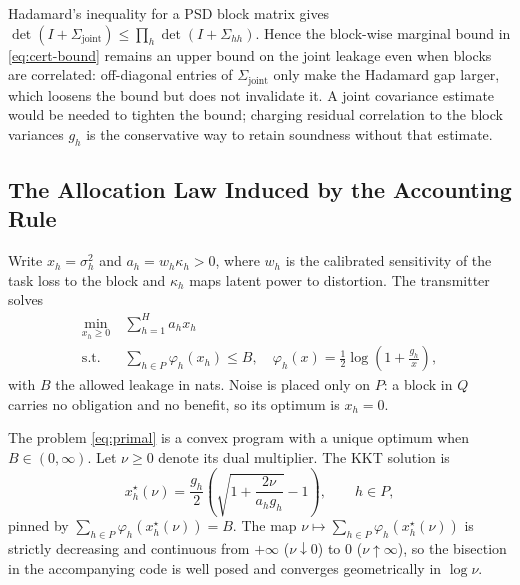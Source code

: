 \begin{remark}
\label{rm:corr}
Hadamard's inequality for a PSD block matrix gives
$\det(I+\Sigma_{\mathrm{joint}})\le\prod_h\det(I+\Sigma_{hh})$. Hence the
block-wise marginal bound in \eqref{eq:cert-bound} remains an upper bound on
the joint leakage even when blocks are correlated: off-diagonal entries of
$\Sigma_{\mathrm{joint}}$ only make the Hadamard gap larger, which loosens
the bound but does not invalidate it. A joint covariance estimate would be
needed to tighten the bound; charging residual correlation to the block
variances $g_h$ is the conservative way to retain soundness without that
estimate.
\end{remark}

\subsection{The Allocation Law Induced by the Accounting Rule}
\label{sec:allocation}

Write $x_h=\sigma_h^{2}$ and $a_h=w_h\kappa_h>0$, where $w_h$ is the
calibrated sensitivity of the task loss to the block and $\kappa_h$ maps
latent power to distortion. The transmitter solves
\begin{equation}\begin{split}
\min_{x_h\ge0}\ &\sum_{h=1}^{H} a_h x_h\\
\text{s.t.}\ &\sum_{h\in P}\varphi_h(x_h)\le B,\quad
\varphi_h(x)=\tfrac12\log\!\left(1+\frac{g_h}{x}\right),
\end{split}\label{eq:primal}
\end{equation}
with $B$ the allowed leakage in nats. Noise is placed only on $P$: a block in
$Q$ carries no obligation and no benefit, so its optimum is $x_h=0$.

\begin{theorem}
\label{th:allocation}
The problem \eqref{eq:primal} is a convex program with a unique optimum when
$B\in(0,\infty)$. Let $\nu\ge0$ denote its dual multiplier. The KKT solution is
\begin{equation}
x_h^{\star}(\nu)=\frac{g_h}{2}\left(
\sqrt{1+\frac{2\nu}{a_h g_h}}-1\right),\qquad h\in P,
\label{eq:kkt}
\end{equation}
pinned by $\sum_{h\in P}\varphi_h(x_h^\star(\nu))=B$. The map
$\nu\mapsto\sum_{h\in P}\varphi_h(x_h^\star(\nu))$ is strictly decreasing and
continuous from $+\infty$ ($\nu\downarrow0$) to $0$ ($\nu\uparrow\infty$), so
the bisection in the accompanying code is well posed and converges
geometrically in $\log\nu$.
\end{theorem}

